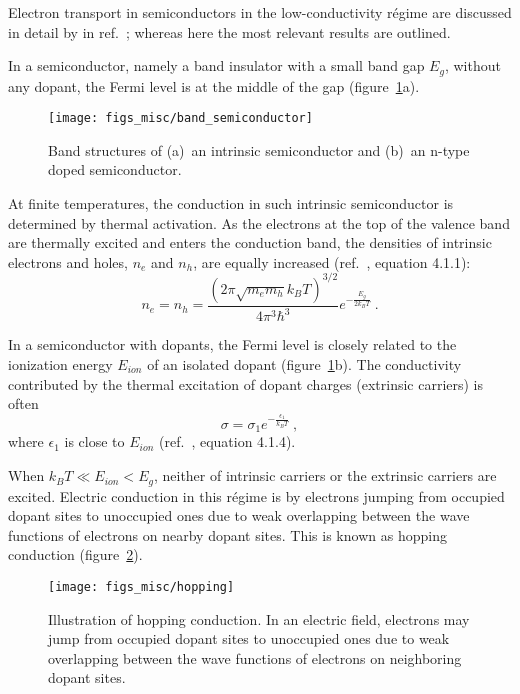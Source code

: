 Electron transport in semiconductors in the low-conductivity r\'egime are discussed in detail by \citeauthor{schklovskii_efros} in ref.~\cite{schklovskii_efros}; whereas here the most relevant results are outlined.

In a semiconductor, namely a band insulator with a small band gap $E_g$, without any dopant, the Fermi level is at the middle of the gap (figure~\ref{fig:band_semiconductor}a). %
\begin{figure}[ht]%
    \centering%
    \texttt{[image: figs\_misc/band\_semiconductor]}%
    \caption[Band structures of an intrinsic semiconductor and an n-type doped semiconductor]{\label{fig:band_semiconductor}Band structures of (a)~an intrinsic semiconductor and (b)~an n-type doped semiconductor.}%
\end{figure}%
%
At finite temperatures, the conduction in such intrinsic semiconductor is determined by thermal activation. As the electrons at the top of the valence band are thermally excited and enters the conduction band, the densities of intrinsic electrons and holes, $n_e$ and $n_h$, are equally increased (ref.~\cite{schklovskii_efros}, equation 4.1.1):%
\begin{equation}
    n_e = n_h = \frac{\left(2\pi\sqrt{m_e m_h}k_B T\right)^{3/2}}{4\pi^3\hbar^3}e^{-\frac{E_g}{2 k_B T}}~.
\end{equation}

In a semiconductor with dopants, the Fermi level is closely related to the ionization energy $E_{ion}$ of an isolated dopant (figure~\ref{fig:band_semiconductor}b). The conductivity contributed by the thermal excitation of dopant charges (extrinsic carriers) is often%
\begin{equation}
    \sigma = \sigma_1 e^{-\frac{\epsilon_1}{k_B T}}~,
\end{equation}%
where $\epsilon_1$ is close to $E_{ion}$ (ref.~\cite{schklovskii_efros}, equation 4.1.4).

When $k_B T \ll E_{ion} < E_g$, neither of intrinsic carriers or the extrinsic carriers are excited. Electric conduction in this r\'egime is by electrons jumping from occupied dopant sites to unoccupied ones due to weak overlapping between the wave functions of electrons on nearby dopant sites. This is known as hopping conduction (figure~\ref{fig:hopping}).%
\begin{figure}[ht]%
    \centering%
    \texttt{[image: figs\_misc/hopping]}%
    \caption[Illustration of hopping conduction]{\label{fig:hopping}Illustration of hopping conduction. In an electric field, electrons may jump from occupied dopant sites to unoccupied ones due to weak overlapping between the wave functions of electrons on neighboring dopant sites.}%
\end{figure}%